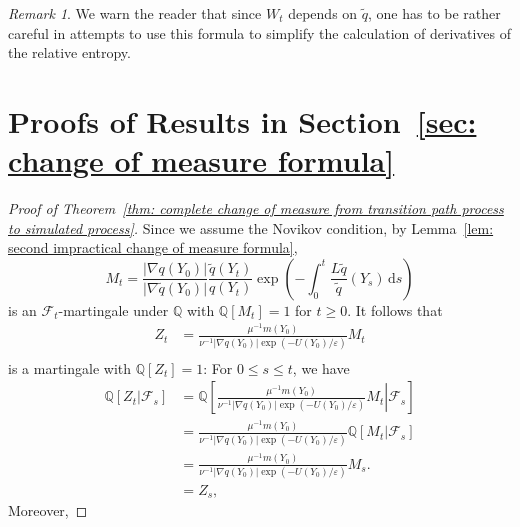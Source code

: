 \documentclass[reqno]{amsart}
\newcommand{\eps}{\varepsilon}
\newcommand{\1}{\mathds{1}}
\renewcommand{\d}{\mathrm{d}}
\newcommand{\grad}{\nabla}
\newcommand{\Q}{\mathds{Q}}
\newcommand{\F}{\mathcal{F}}
\theoremstyle{definition}
\theoremstyle{remark}
\newtheorem{remark}{Remark}
\begin{document}
\begin{remark}
We warn the reader that since $W_t$ depends on $\tilde q$, one has to be rather careful in attempts to use this formula to simplify the calculation of derivatives of the relative entropy. 
\end{remark}



\appendix

\section{Proofs of Results in Section~\ref{sec: change of measure formula}}
\label{apx: change of measure formula}


\begin{proof}[Proof of Theorem~\ref{thm: complete change of measure from transition path process to simulated process}]
  Since we assume the Novikov condition, by Lemma~\ref{lem: second impractical change of measure formula}, 
  \begin{equation*}
    M_t =  \frac{\lvert \grad  q (Y_0) \rvert}{\lvert \grad \tilde q (Y_0) \rvert} \frac{\tilde q(Y_t)}{q(Y_t)} \exp \left (-\int_0^t \frac{L \tilde q}{\tilde q}(Y_s) \, \d s  \right )
  \end{equation*}
  is an $\F_t$-martingale under $\Q$ with $\Q[M_t]=1$ for $t \geq 0$. It follows that 
  \begin{align*}
    Z_t &= \frac{\mu^{-1} m(Y_0)}{\nu^{-1} \lvert \grad q(Y_0) \rvert \exp(-U(Y_0) /\eps)} M_t \\
  \end{align*}
  is a martingale with $\Q[Z_t]=1$: For $0 \leq s \leq t$, we have 
  \begin{align*}
    \Q[Z_t \vert \F_s] &= \Q \left [  \left . \frac{\mu^{-1} m(Y_0)}{\nu^{-1} \lvert \grad q(Y_0) \rvert \exp(-U(Y_0) /\eps)} M_t \right \vert \F_s \right ] \\
                       &=  \frac{\mu^{-1} m(Y_0)}{\nu^{-1} \lvert \grad q(Y_0) \rvert \exp(-U(Y_0) /\eps)} \Q [ M_t \vert \F_s] \\
                       &= \frac{\mu^{-1} m(Y_0)}{\nu^{-1} \lvert \grad q(Y_0) \rvert \exp(-U(Y_0) /\eps)} M_s. \\
                       &= Z_s, 
  \end{align*}
  Moreover, 

\end{proof}
\end{document}
